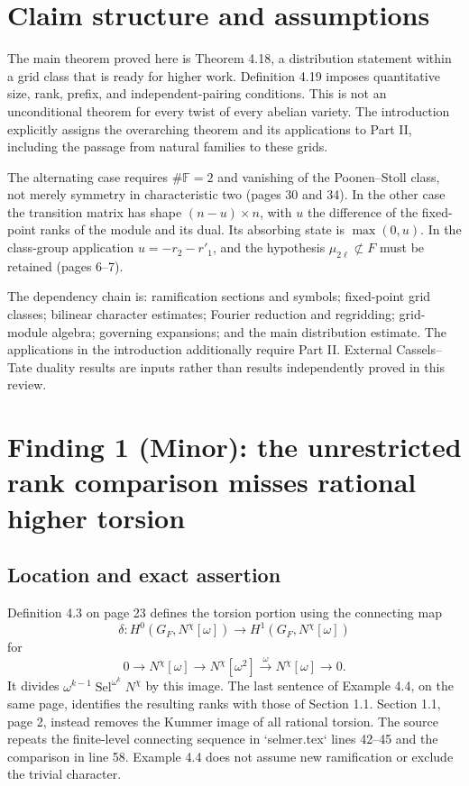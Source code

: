 \documentclass[10pt]{article}
\begin{document}
\section*{Claim structure and assumptions}
The main theorem proved here is Theorem 4.18, a distribution statement within a grid class that is ready for higher work. Definition 4.19 imposes quantitative size, rank, prefix, and independent-pairing conditions. This is not an unconditional theorem for every twist of every abelian variety. The introduction explicitly assigns the overarching theorem and its applications to Part II, including the passage from natural families to these grids.\par
The alternating case requires \(\#\mathbb F=2\) and vanishing of the Poonen–Stoll class, not merely symmetry in characteristic two (pages 30 and 34). In the other case the transition matrix has shape \((n-u)\times n\), with \(u\) the difference of the fixed-point ranks of the module and its dual. Its absorbing state is \(\max(0,u)\). In the class-group application \(u=-r_2-r'_1\), and the hypothesis \(\mu_{2\ell}\not\subset F\) must be retained (pages 6–7).\par
The dependency chain is: ramification sections and symbols; fixed-point grid classes; bilinear character estimates; Fourier reduction and regridding; grid-module algebra; governing expansions; and the main distribution estimate. The applications in the introduction additionally require Part II. External Cassels–Tate duality results are inputs rather than results independently proved in this review.\par
\section*{Finding 1 (Minor): the unrestricted rank comparison misses rational higher torsion}
\subsection*{Location and exact assertion}
Definition 4.3 on page 23 defines the torsion portion using the connecting map \[\delta:H^0(G_F,N^\chi[\omega])\longrightarrow H^1(G_F,N^\chi[\omega])\] for \[0\longrightarrow N^\chi[\omega]\longrightarrow N^\chi[\omega^2]
 \xrightarrow{\omega}N^\chi[\omega]\longrightarrow0.\] It divides \(\omega^{k-1}\operatorname{Sel}^{\omega^k}N^\chi\) by this image. The last sentence of Example 4.4, on the same page, identifies the resulting ranks with those of Section 1.1. Section 1.1, page 2, instead removes the Kummer image of all rational torsion. The source repeats the finite-level connecting sequence in `selmer.tex` lines 42–45 and the comparison in line 58. Example 4.4 does not assume new ramification or exclude the trivial character.\par
\end{document}
